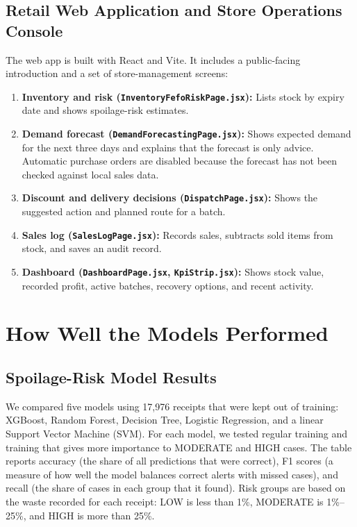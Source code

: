 \documentclass[12pt,a4paper]{article}
\renewcommand{\_}{\oldunderscore\allowbreak}
\begin{document}
\subsection{Retail Web Application and Store Operations Console}
The web app is built with React and Vite. It includes a public-facing introduction and a set of store-management screens:
\begin{enumerate}[leftmargin=18pt, itemsep=1.5pt]
    \item \textbf{Inventory and risk (\texttt{InventoryFefoRiskPage.jsx}):} Lists stock by expiry date and shows spoilage-risk estimates.
    \item \textbf{Demand forecast (\texttt{DemandForecastingPage.jsx}):} Shows expected demand for the next three days and explains that the forecast is only advice. Automatic purchase orders are disabled because the forecast has not been checked against local sales data.
    \item \textbf{Discount and delivery decisions (\texttt{DispatchPage.jsx}):} Shows the suggested action and planned route for a batch.
    \item \textbf{Sales log (\texttt{SalesLogPage.jsx}):} Records sales, subtracts sold items from stock, and saves an audit record.
    \item \textbf{Dashboard (\texttt{DashboardPage.jsx}, \texttt{KpiStrip.jsx}):} Shows stock value, recorded profit, active batches, recovery options, and recent activity.
\end{enumerate}

\section{How Well the Models Performed}

\subsection{Spoilage-Risk Model Results}
\label{sec:spoilage_results}

We compared five models using 17,976 receipts that were kept out of training: XGBoost, Random Forest, Decision Tree, Logistic Regression, and a linear Support Vector Machine (SVM). For each model, we tested regular training and training that gives more importance to MODERATE and HIGH cases. The table reports accuracy (the share of all predictions that were correct), F1 scores (a measure of how well the model balances correct alerts with missed cases), and recall (the share of cases in each group that it found). Risk groups are based on the waste recorded for each receipt: LOW is less than 1\%, MODERATE is 1\%--25\%, and HIGH is more than 25\%.
\end{document}
